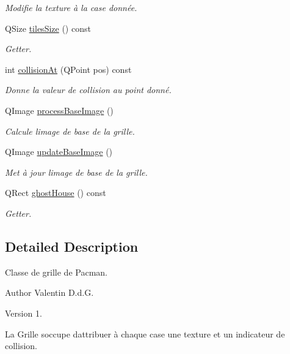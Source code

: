 \begin{DoxyCompactItemize}
\begin{DoxyCompactList}\small\item\em Modifie la texture à la case donnée. \end{DoxyCompactList}\item 
Q\+Size \hyperlink{class_grid_ac8e968e4f13ada41c29501722257427a}{tiles\+Size} () const 
\begin{DoxyCompactList}\small\item\em Getter. \end{DoxyCompactList}\item 
int \hyperlink{class_grid_a711ac8dd739f2fded9160f467be76bf4}{collision\+At} (Q\+Point pos) const 
\begin{DoxyCompactList}\small\item\em Donne la valeur de collision au point donné. \end{DoxyCompactList}\item 
Q\+Image \hyperlink{class_grid_aad0be5d0410c8abd33b24f6c00db7946}{process\+Base\+Image} ()
\begin{DoxyCompactList}\small\item\em Calcule l\textquotesingle{}image de base de la grille. \end{DoxyCompactList}\item 
Q\+Image \hyperlink{class_grid_afc924f671d0370c59237c21a94a8f421}{update\+Base\+Image} ()
\begin{DoxyCompactList}\small\item\em Met à jour l\textquotesingle{}image de base de la grille. \end{DoxyCompactList}\item 
Q\+Rect \hyperlink{class_grid_a96c1d1e403aa5e04aeb6b194795448c4}{ghost\+House} () const 
\begin{DoxyCompactList}\small\item\em Getter. \end{DoxyCompactList}\end{DoxyCompactItemize}


\subsection{Detailed Description}
Classe de grille de Pacman. 

\begin{DoxyAuthor}{Author}
Valentin D.\+d.\+G. 
\end{DoxyAuthor}
\begin{DoxyVersion}{Version}
1.
\end{DoxyVersion}
La Grille s\textquotesingle{}occupe d\textquotesingle{}attribuer à chaque case une texture et un indicateur de collision.

